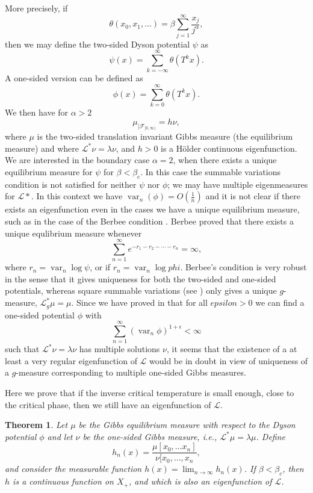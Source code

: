 \documentclass[11pt, a4paper, oneside]{article}
\newtheorem{thm}{Theorem}
\theoremstyle{definition}
\theoremstyle{remark}
\providecommand{\opn}{\operatorname}
\providecommand{\var}{\opn{var}}
\begin{document}
More precisely, if
$$\theta(x_0, x_1,\ldots)=\beta \sum_{j=1}^\infty \frac{x_j}{j^\alpha},$$
then we may define the two-sided Dyson potential $\psi$ as
$$\psi(x)=\sum_{k=-\infty}^\infty \theta(T^k x).$$ 
A one-sided version can be defined as
$$\phi(x)=\sum_{k=0}^\infty \theta (T^k x).$$
We then have for $\alpha>2$
$$\mu_{|{\mathcal F}_{[0,\infty)}}= h\nu,$$
where $\mu$ is the two-sided translation invariant Gibbs measure (the
equilibrium measure) and where ${\mathcal L}^*\nu=\lambda \nu$, and $h>0$ is a
H\"older continuous eigenfunction. We are interested in the boundary case
$\alpha=2$, when there exists a unique equilibrium measure for $\psi$ for
$\beta<\beta_c$. In this case the summable variations condition is not satisfied
for neither $\psi$ nor $\phi$; we may have multiple eigenmeasures for ${\mathcal
  L}*$. In this context we have $\var_n(\phi)=O(\frac{1}{n})$ and it is not
clear if there exists an eigenfunction even in the cases we have a unique
equilibrium measure, such as in the case of the Berbee condition \cite{berbee2}.
Berbee proved that there exists a unique equlibrium measure whenever
\begin{equation}\label{berbee}
  \sum_{n=1}^\infty e^{-r_1-r_2-\cdots-r_n}=\infty,    
\end{equation}
where $r_n=\var_n \log \psi$, or if $r_n=\var_n \log phi$. Berbee's condition is
very robust in the sense that it gives uniqueness for both the two-sided and
one-sided potentials, whereas square summable variations (see \cite{johob}) only
gives a unique $g$-measure, ${\mathcal L}_g^* \mu=\mu$. Since we have proved in
\cite{jop3} that for all $epsilon>0$ we can find a one-sided potential $\phi$
with
$$\sum_{n=1}^\infty (\var_n \phi)^{1+\epsilon}<\infty$$
such that ${\mathcal L}^* \nu=\lambda \nu$ has multiple solutions $\nu$, it
seems that the existence of a at least a very regular eigenfunction of
${\mathcal L}$ would be in doubt in view of uniqueness of a $g$-measure
corresponding to multiple one-sided Gibbs measures.

Here we prove that if the inverse critical temperature is small enough, close to
the critical phase, then we still have an eigenfunction of ${\mathcal L}$.

\begin{thm}\label{main}
  Let $\mu$ be the Gibbs equilibrium measure with respect to the Dyson potential
  $\phi$ and let $\nu$ be the one-sided Gibbs measure, i.e., ${\mathcal
    L}^*\mu=\lambda \mu$. Define
$$h_n(x)=\frac{\mu[x_0,\ldots x_n]}{\nu[x_0,\ldots, x_n},$$
and consider the measurable function $h(x)=\lim_{n\to \infty}h_n(x)$. If
$\beta<\beta_c$, then $h$ is a continuous function on $X_+$, and which is also
an eigenfunction of ${\mathcal L}$.
\end{thm}
\end{document}
